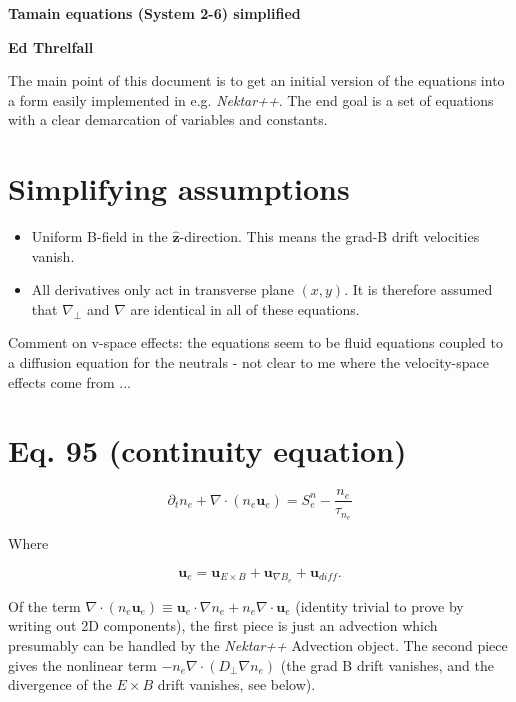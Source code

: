 \documentclass[11pt]{article}
\newcommand{\mbf}{\mathbf}
\begin{document}
\centerline{\bf \large \textbf{Tamain equations (System 2-6) simplified}}
\centerline{\bf \large \textbf{Ed Threlfall}}

\vspace{0.5cm}

The main point of this document is to get an initial version of the equations into a form easily implemented in e.g. {\it Nektar++}.  The end goal is a set of equations with a clear demarcation of variables and constants.

\section{Simplifying assumptions}

\begin{itemize}
\item Uniform B-field in the $\mbf{\hat{z}}$-direction.  This means the grad-B drift velocities vanish.
\item All derivatives only act in transverse plane $(x,y)$. It is therefore assumed that $\nabla_{\perp}$ and $\nabla$ are identical in all of these equations.
\end{itemize}

Comment on v-space effects: the equations seem to be fluid equations coupled to a diffusion equation for the neutrals - not clear to me where the velocity-space effects come from ...

\section{Eq. 95 (continuity equation)}

\begin{equation}
\partial_t 	n_e + \nabla \cdot (n_e \mbf{u}_e) = S_e^n-\frac{n_e}{\tau_{n_e}}
\end{equation}

Where

\begin{equation}
\mbf{u}_e=\mbf{u}_{E \times B} +\mbf{u}_{\nabla B_e}+\mbf{u}_{diff}.
\end{equation}

Of the term $\nabla \cdot (n_e \mbf{u}_e) \equiv \mbf{u}_e \cdot \nabla n_e + n_e \nabla \cdot \mbf{u}_e$ (identity trivial to prove by writing out 2D components), the first piece is just an advection which presumably can be handled by the {\it Nektar++} Advection object.  The second piece gives the nonlinear term $-n_e \nabla \cdot (D_{\perp} \nabla n_e)$ (the grad B drift vanishes, and the divergence of the $E \times B$ drift vanishes, see below).
\end{document}
